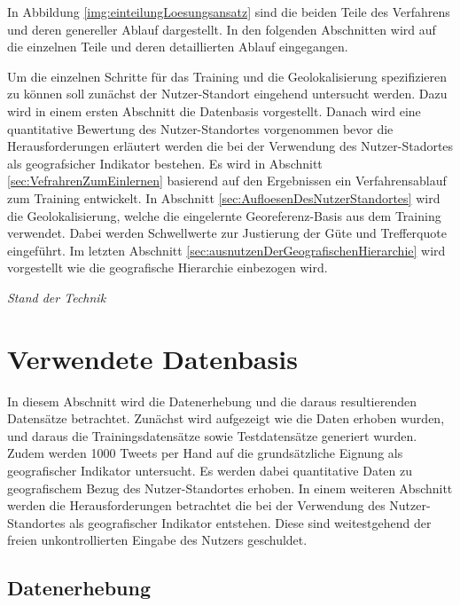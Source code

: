 		In Abbildung \ref{img:einteilungLoesungsansatz} sind die beiden Teile des Verfahrens und deren genereller Ablauf dargestellt.
		In den folgenden Abschnitten wird auf die einzelnen Teile und deren detaillierten Ablauf eingegangen. 
		
		Um die einzelnen Schritte für das Training und die Geolokalisierung spezifizieren zu können soll zunächst der Nutzer-Standort eingehend untersucht werden.
		Dazu wird in einem ersten Abschnitt die Datenbasis vorgestellt.
		Danach wird eine quantitative Bewertung des Nutzer-Standortes vorgenommen bevor die Herausforderungen erläutert werden die bei der Verwendung des Nutzer-Stadortes als geografsicher Indikator bestehen.
		Es wird in Abschnitt \ref{sec:VefrahrenZumEinlernen} basierend auf den Ergebnissen ein Verfahrensablauf zum Training entwickelt. 
		In Abschnitt \ref{sec:AufloesenDesNutzerStandortes} wird die Geolokalisierung, welche die eingelernte Georeferenz-Basis aus dem Training verwendet.
		Dabei werden Schwellwerte zur Justierung der Güte und Trefferquote eingeführt.
		Im letzten Abschnitt \ref{sec:ausnutzenDerGeografischenHierarchie} wird vorgestellt wie die geografische Hierarchie einbezogen wird.

		\textit{Stand der Technik} 

	\section{Verwendete Datenbasis}

		In diesem Abschnitt wird die Datenerhebung und die daraus resultierenden Datensätze betrachtet.
		Zunächst wird aufgezeigt wie die Daten erhoben wurden, und daraus die Trainingsdatensätze sowie Testdatensätze generiert wurden.
		Zudem werden 1000 Tweets per Hand auf die grundsätzliche Eignung als geografischer Indikator untersucht.
		Es werden dabei quantitative Daten zu geografischem Bezug des Nutzer-Standortes erhoben.
		In einem weiteren Abschnitt werden die Herausforderungen betrachtet die bei der Verwendung des Nutzer-Standortes als geografischer Indikator entstehen. 
		Diese sind weitestgehend der freien unkontrollierten Eingabe des Nutzers geschuldet.

		\subsection{Datenerhebung} 

